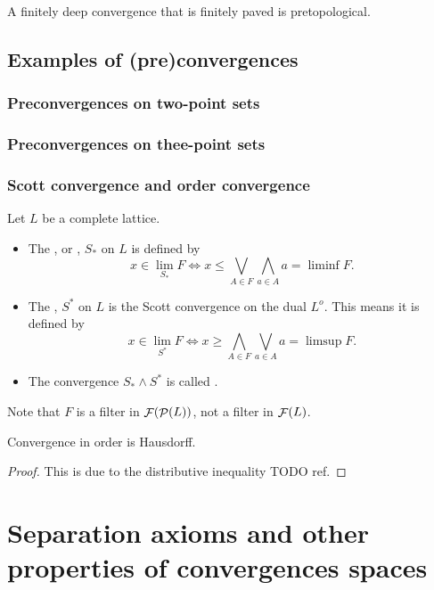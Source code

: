 \begin{proposition}
A finitely deep convergence that is finitely paved is pretopological.
\end{proposition}




\subsection{Examples of (pre)convergences}
\subsubsection{Preconvergences on two-point sets}
\subsubsection{Preconvergences on thee-point sets}

\subsubsection{Scott convergence and order convergence}
\begin{definition}
Let $L$ be a complete lattice.
\begin{itemize}
\item The , or , $S_*$ on $L$ is defined by
\[ x \in \lim_{S_*} F \iff x \leq \bigvee_{A\in F}\bigwedge_{a\in A}a = \liminf F. \]

\item The , $S^*$ on $L$ is the Scott convergence on the dual $L^o$. This means it is defined by
\[ x \in \lim_{S^*} F \iff x \geq \bigwedge_{A\in F}\bigvee_{a\in A}a = \limsup F. \]
\item The convergence $S_* \wedge S^*$ is called .
\end{itemize}
\end{definition}
Note that $F$ is a filter in $\mathop{\mathcal{F}}(\mathop{\mathcal{P}}(L))$, not a filter in $\mathop{\mathcal{F}}(L)$.

\begin{proposition}
Convergence in order is Hausdorff.
\end{proposition}
\begin{proof}
This is due to the distributive inequality TODO ref.
\end{proof}

\section{Separation axioms and other properties of convergences spaces}
